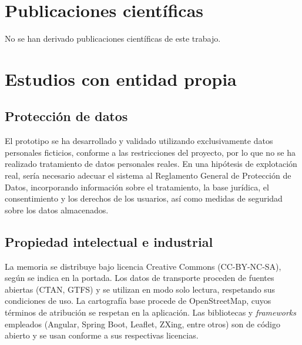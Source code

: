 \section{Publicaciones científicas}
\label{sec:apendice-publicaciones}

No se han derivado publicaciones científicas de este trabajo.


\section{Estudios con entidad propia}
\label{sec:apendice-estudios}

\subsection{Protección de datos}

El prototipo se ha desarrollado y validado utilizando exclusivamente datos personales ficticios, conforme a las restricciones del proyecto, por lo que no se ha realizado tratamiento de datos personales reales. En una hipótesis de explotación real, sería necesario adecuar el sistema al Reglamento General de Protección de Datos, incorporando información sobre el tratamiento, la base jurídica, el consentimiento y los derechos de los usuarios, así como medidas de seguridad sobre los datos almacenados.

\subsection{Propiedad intelectual e industrial}

La memoria se distribuye bajo licencia Creative Commons (CC-BY-NC-SA), según se indica en la portada. Los datos de transporte proceden de fuentes abiertas (CTAN, GTFS) y se utilizan en modo solo lectura, respetando sus condiciones de uso. La cartografía base procede de OpenStreetMap, cuyos términos de atribución se respetan en la aplicación. Las bibliotecas y \textit{frameworks} empleados (Angular, Spring Boot, Leaflet, ZXing, entre otros) son de código abierto y se usan conforme a sus respectivas licencias.
